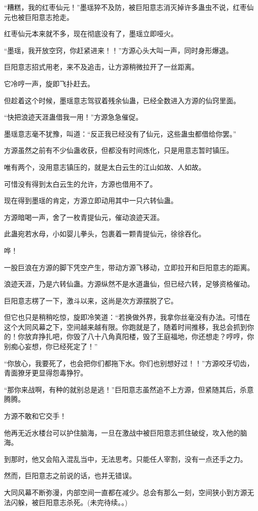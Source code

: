 \begin{this_body}
“糟糕，我的红枣仙元！”墨瑶猝不及防，被巨阳意志消灭掉许多蛊虫不说，红枣仙元也被巨阳意志抢走。

红枣仙元本来就不多，现在彻底没有了，墨瑶立即哑火。

“墨瑶，我开放空窍，你赶紧进来！！”方源心头大叫一声，同时身形爆退。

巨阳意志招式用老，来不及追击，让方源稍微拉开了一丝距离。

它冷哼一声，旋即飞扑赶去。

但趁着这个时候，墨瑶意志驾驭着残余仙蛊，已经全数进入方源的仙窍里面。

“快把浪迹天涯蛊借我一用！”方源急急催促。

墨瑶意志毫不犹豫，叫道：“反正我已经没有了仙元，这些蛊虫都借给你罢。”

方源虽然之前有不少仙蛊收获，但都没有时间炼化，只是用意志暂时镇压。

唯有两个，没用意志镇压的，就是太白云生的江山如故、人如故。

可惜没有得到太白云生的允许，方源也借用不了。

现在得到墨瑶的肯定，方源立即动用其中一只六转仙蛊。

方源暗喝一声，舍了一枚青提仙元，催动浪迹天涯。

此蛊宛若水母，小如婴儿拳头，包裹着一颗青提仙元，徐徐吞化。

哗！

一股巨浪在方源的脚下凭空产生，带动方源飞移动，立即拉开和巨阳意志的距离。

浪迹天涯，乃是六转仙蛊。方源纵然不是水道蛊仙，但已经六转，足够资格催动。

巨阳意志楞了一下，激斗以来，这尚是次方源摆脱了它。

但它也只是稍稍吃惊，旋即冷笑道：“若换做外界，我拿你丝毫没有办法。可惜在这个大同风幕之下，空间越来越有限。你跑就是了，随着时间推移，我总会抓到你的！你放弃挣扎吧，你毁了八十八角真阳楼，毁了王庭福地，你还想走？哼哼，你别痴心妄想，你已经死定了！”

“你放心，我要死了，也会把你们都拖下水。你们也别想好过！！”方源咬牙切齿，青面獠牙更显得怨毒狰狞。

“那你来战啊，有种的就别总是逃！”巨阳意志虽然追不上方源，但紧随其后，杀意腾腾。

方源不敢和它交手！

他再无近水楼台可以护住脑海，一旦在激战中被巨阳意志抓住破绽，攻入他的脑海。

到那时，他又会陷入混乱当中，无法思考。只能任人宰割，没有一点还手之力。

然而，巨阳意志之前说的话，也并无错误。

大同风幕不断弥漫，内部空间一直都在减少。总会有那么一刻，空间狭小到方源无法闪躲，被巨阳意志杀死。(未完待续。。)

\end{this_body}

